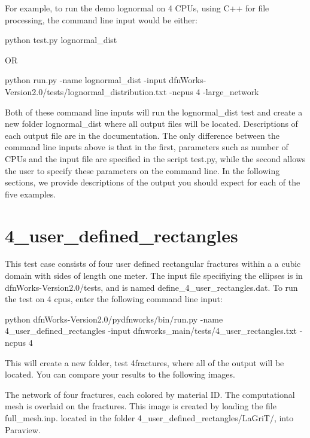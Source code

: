 \documentclass[letterpaper,10pt,english]{sphinxmanual}
\begin{document}
For example, to run the demo lognormal on 4 CPUs, using C++ for file processing,  the command line input would be either:

python test.py lognormal\_dist

OR

python run.py -name lognormal\_dist -input dfnWorks-Version2.0/tests/lognormal\_distribution.txt -ncpus 4 -large\_network

Both of these command line inputs will run the lognormal\_dist test and create a new folder lognormal\_dist where all output files will be located. Descriptions of each output file are in the documentation. The only difference between the command line inputs above is that in the first, parameters such as number of CPUs and the input file are specified in the script test.py, while the second allows the user to specify these parameters on the command line. In the following sections, we provide descriptions of the output you should expect for each of the five examples.


\section{4\_user\_defined\_rectangles}
\label{examples:user-defined-rectangles}
This test case consists of four user defined rectangular fractures within a a cubic domain with sides of length one meter. The input file specifiying the ellipses is in dfnWorks-Version2.0/tests, and is named define\_4\_user\_rectangles.dat. To run the test on 4 cpus, enter the following command line input:

python dfnWorks-Version2.0/pydfnworks/bin/run.py -name 4\_user\_defined\_rectangles -input dfnworks\_main/tests/4\_user\_rectangles.txt -ncpus 4

This will create a new folder, test 4fractures, where all of the output will be located. You can compare your results to the following images.

The network of four fractures, each colored by material ID. The computational mesh is overlaid on the fractures. This image is created by loading the file full\_mesh.inp. located in the folder 4\_user\_defined\_rectangles/LaGriT/, into Paraview.

{\hfill{}\hfill}
\end{document}
